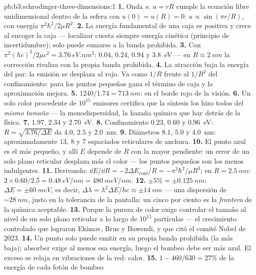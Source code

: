 \begin{solution}{pb:b3:schrodinger-three-dimensions:1}
\textbf{1.} Onda $s$: $u = rR$ cumple la ecuación libre unidimensional
dentro de la esfera con $u(0) = u(R) = 0$: $u \propto \sin(\pi r/R)$, con
energía $\pi^2\hbar^2/2\mu R^2$.
\textbf{2.} La energía fundamental de una caja es positiva y crece al
encoger la caja --- localizar cuesta siempre energía cinética (principio de
incertidumbre); solo puede sumarse a la banda prohibida.
\textbf{3.} Con $\pi^2(\hbar c)^2/2\mu c^2 = \qty{3.76}{eV.nm^2}$:
$0.04$, $0.24$, $0.94$ y \qty{3.8}{eV} --- en $R \approx \qty{2}{nm}$
la corrección rivaliza con la propia banda prohibida.
\textbf{4.} La atracción baja la energía del par: la emisión se desplaza al
rojo. Va como $1/R$ frente al $1/R^2$ del confinamiento: para los puntos
pequeños gana el término de caja y la aproximación mejora.
\textbf{5.} $1240/1.74 = \qty{713}{nm}$: en el borde rojo de la visión.
\textbf{6.} Un solo color procedente de $10^{15}$ emisores certifica que la
síntesis los hizo todos del \emph{mismo tamaño} --- la monodispersidad, la
hazaña química que hay detrás de la física.
\textbf{7.} $1.97$, $2.34$ y \qty{2.70}{eV}.
\textbf{8.} Confinamiento $0.23$, $0.60$ y \qty{0.96}{eV}: $R =
\sqrt{3.76/\Delta E}$ da $4.0$, $2.5$ y \qty{2.0}{nm}.
\textbf{9.} Diámetros $8.1$, $5.0$ y \qty{4.0}{nm}: aproximadamente $13$,
$8$ y $7$ espaciados reticulares de anchura.
\textbf{10.} El punto azul es el más pequeño, y allí $E$ depende de $R$ con
la mayor pendiente: un error de un solo plano reticular desplaza más el
color --- los puntos pequeños son los menos indulgentes.
\textbf{11.} Derivando: $\dd E/\dd R = -2\Delta E_{\text{conf}}/R
= -\pi^2\hbar^2/\mu R^3$; en $R = \qty{2.5}{nm}$: $2 \times 0.60/2.5
= \qty{0.48}{eV/nm} = \qty{480}{meV/nm}$.
\textbf{12.} $\pm 5\% = \pm\qty{0.125}{nm}$: $\Delta E = \pm
\qty{60}{meV}$, es decir, $\Delta\lambda = \lambda^2\Delta E/hc \approx
\pm\qty{14}{nm}$ --- una dispersión de $\sim\qty{28}{nm}$, justo en la
tolerancia de la pantalla: un cinco por ciento es la \emph{frontera} de la
química aceptable.
\textbf{13.} Porque la pureza de color exige controlar el tamaño al nivel
de un solo plano reticular a lo largo de $10^{15}$ partículas --- el
crecimiento controlado que lograron Ekimov, Brus y Bawendi, y que citó el
comité Nobel de 2023.
\textbf{14.} Un punto solo puede emitir en su propia banda prohibida (la
más baja); absorber exige al menos esa energía, luego el bombeo debe ser más
azul. El exceso se relaja en vibraciones de la red: calor.
\textbf{15.} $1 - 460/630 = 27\%$ de la energía de cada fotón de bombeo

\end{solution}
